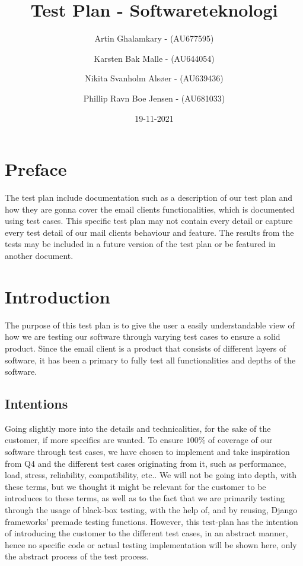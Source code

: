 \documentclass{article}
\title{Test Plan - Softwareteknologi} %
\author{Artin Ghalamkary - (AU677595) \and Karsten Bak Malle - (AU644054) \and Nikita Svanholm Alsøer - (AU639436) \and Phillip Ravn Boe Jensen - (AU681033)}%
\date{19-11-2021}
\begin{document}
\maketitle
\section*{Preface} 
The test plan include documentation such as a description of our test plan and how they are gonna cover the email clients functionalities, which is documented using test cases. This specific test plan may not contain every detail or capture every test detail of our mail clients behaviour and feature. The results from the tests may be included in a future version of the test plan or be featured in another document.

\section*{Introduction} 

The purpose of this test plan is to give the user a easily understandable view of how we are testing our software through varying test cases to ensure a solid product. Since the email client is a product that consists of different layers of software, it has been a primary to fully test all functionalities and depths of the software. 
\subsection*{Intentions} 

Going slightly more into the details and technicalities, for the sake of the customer, if more specifics are wanted. To ensure $100\%$ of coverage of our software through test cases, we have chosen to implement and take inspiration from Q4 and the different test cases originating from it, such as performance, load, stress, reliability, compatibility, etc.. We will not be going into depth, with these terms, but we thought it might be relevant for the customer to be introduces to these terms, as well as to the fact that we are primarily testing through the usage of black-box testing, with the help of, and by reusing, Django frameworks' premade testing functions.
\newline However, this test-plan has the intention of introducing the customer to the different test cases, in an abstract manner, hence no specific code or actual testing implementation will be shown here, only the abstract process of the test process.
\end{document}
